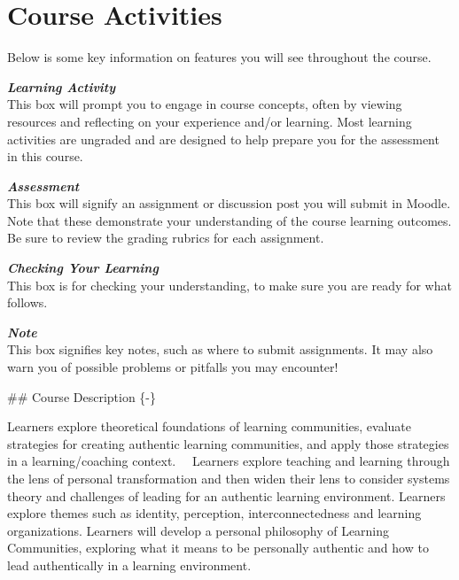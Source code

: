 \documentclass[
]{book}
\begin{document}
\hypertarget{course-activities}{%
\section*{Course Activities}\label{course-activities}}

Below is some key information on features you will see throughout the course.

\begin{reflect}
\textbf{\emph{Learning Activity}}\\
This box will prompt you to engage in course concepts, often by viewing resources and reflecting on your experience and/or learning. Most learning activities are ungraded and are designed to help prepare you for the assessment in this course.
\end{reflect}

\begin{assessment}
\textbf{\emph{Assessment}}\\
This box will signify an assignment or discussion post you will submit in Moodle. Note that these demonstrate your understanding of the course learning outcomes. Be sure to review the grading rubrics for each assignment.
\end{assessment}

\begin{progress}
\textbf{\emph{Checking Your Learning}}\\
This box is for checking your understanding, to make sure you are ready for what follows.
\end{progress}

\begin{caution}
\textbf{\emph{Note}}\\
This box signifies key notes, such as where to submit assignments. It may also warn you of possible problems or pitfalls you may encounter!
\end{caution}
\#\# Course Description \{-\}

Learners explore theoretical foundations of learning communities, evaluate strategies for creating authentic learning communities, and apply those strategies in a learning/coaching context.~~ Learners explore teaching and learning through the lens of personal transformation and then widen their lens to consider systems theory and challenges of leading for an authentic learning environment. Learners explore themes such as identity, perception, interconnectedness and learning organizations. Learners will develop a personal philosophy of Learning Communities, exploring what it means to be personally authentic and how to lead authentically in a learning environment.~
\end{document}
